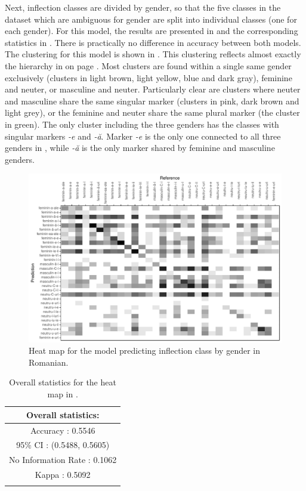 Next, inflection classes are divided by gender, so that the five classes in the dataset which are ambiguous for gender are split into individual classes (one for each gender). For this model, the results are presented in  and the corresponding statistics in . There is practically no difference in accuracy between both models. The clustering for this model is shown in . This clustering reflects almost exactly the hierarchy in  on page \pageref{fig:romanian-hierar-markers-2}. Most clusters are found within a single same gender exclusively (clusters in light brown, light yellow, blue and dark gray), feminine and neuter, or masculine and neuter. Particularly clear are clusters where neuter and masculine share the same singular marker (clusters in pink, dark brown and light grey), or the feminine and neuter share the same plural marker (the cluster in green).  The only cluster including the three genders has the classes with singular markers \textit{-e} and \textit{-ă}. Marker \textit{-e} is the only one connected to all three genders in , while \textit{-ă} is the only marker shared by feminine and masculine genders.

\begin{figure}[!htpb]
  \centering
  \includegraphics[width=1.0\textwidth]{./figures/romanian/class-2-cm.pdf}
  \caption{Heat map for the model predicting inflection class by gender in Romanian.}\label{fig:class-2-cm-romanian}
\end{figure}

\begin{table}[!htpb]
  \centering
  \begin{tabular}{c}
    \lsptoprule
    Overall statistics: \\
    \midrule
    Accuracy : 0.5546\\
    95\% CI : (0.5488, 0.5605)\\
    No Information Rate : 0.1062\\
    Kappa : 0.5092\\
    \lspbottomrule
  \end{tabular}
  \caption{Overall statistics for the heat map in .}\label{tab:class-2-romanian-stats}
\end{table}

